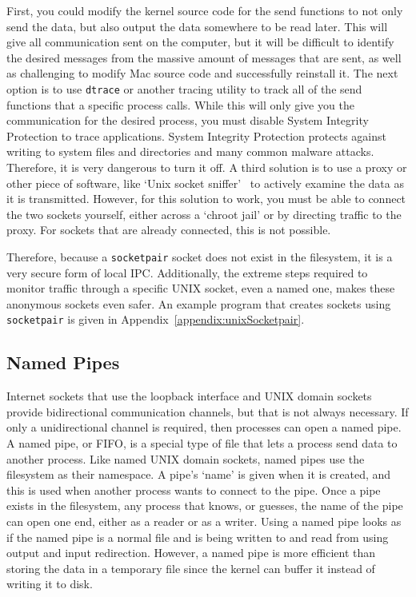 First, you could modify the kernel source code for the send functions to not only send the data, but also output the data somewhere to be read later.  This will give all communication sent on the computer, but it will be difficult to identify the desired messages from the massive amount of messages that are sent, as well as challenging to modify Mac source code and successfully reinstall it.  The next option is to use \texttt{dtrace} or another tracing utility to track all of the send functions that a specific process calls.  While this will only give you the communication for the desired process, you must disable System Integrity Protection to trace applications.  System Integrity Protection protects against writing to system files and directories and many common malware attacks.  Therefore, it is very dangerous to turn it off.  A third solution is to use a proxy or other piece of software, like `Unix socket sniffer'~\cite{socketSniffer} to actively examine the data as it is transmitted.  However, for this solution to work, you must be able to connect the two sockets yourself, either across a `chroot jail' or by directing traffic to the proxy.  For sockets that are already connected, this is not possible.

Therefore, because a \texttt{socketpair} socket does not exist in the filesystem, it is a very secure form of local IPC.  Additionally, the extreme steps required to monitor traffic through a specific UNIX socket, even a named one, makes these anonymous sockets even safer.  An example program that creates sockets using \texttt{socketpair} is given in Appendix~\ref{appendix:unixSocketpair}.

\subsection{Named Pipes}
\label{sec:namedPipes}
Internet sockets that use the loopback interface and UNIX domain sockets provide bidirectional communication channels, but that is not always necessary.  If only a unidirectional channel is required, then processes can open a named pipe.  A named pipe, or FIFO, is a special type of file that lets a process send data to another process.  Like named UNIX domain sockets, named pipes use the filesystem as their namespace.  A pipe's `name' is given when it is created, and this is used when another process wants to connect to the pipe.  Once a pipe exists in the filesystem, any process that knows, or guesses, the name of the pipe can open one end, either as a reader or as a writer.  Using a named pipe looks as if the named pipe is a normal file and is being written to and read from using output and input redirection.  However, a named pipe is more efficient than storing the data in a temporary file since the kernel can buffer it instead of writing it to disk.

